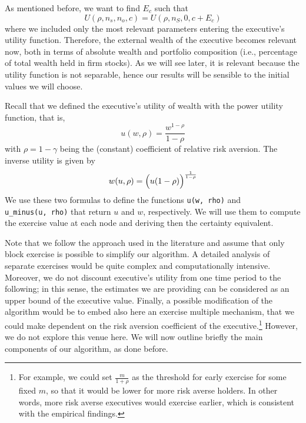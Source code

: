 As mentioned before, we want to find $E_c$ such that 
$$U(\rho, n_s, n_o, c) = U(\rho, n_S, 0, c + E_c) $$
where we included only the most relevant parameters entering the executive's utility function. Therefore, the external wealth of the executive becomes relevant now, both in terms of absolute wealth and portfolio composition (i.e., percentage of total wealth held in firm stocks). As we will see later, it is relevant because the utility function is not separable, hence our results will be sensible to the initial values we will choose.

Recall that we defined the executive's utility of wealth with the power utility function, that is, 
$$u(w, \rho) = \frac{w^{1-\rho}}{1-\rho}$$
with $\rho = 1 - \gamma $ being the (constant) coefficient of relative risk aversion. 
The inverse utility is given by 
$$w(u, \rho) = \Bigl(u(1-\rho)\Bigr)^{\frac{1}{1-\rho}}$$
We use these two formulas to define the functions \verb|u(w, rho)| and \\
\verb|u_minus(u, rho)| that return $u$ and $w$, respectively. We will use them to compute the exercise value at each node and deriving then the certainty equivalent.


Note that we follow the approach used in the literature and assume that only block exercise is possible  to simplify our algorithm. A detailed analysis of separate exercises would be quite complex and computationally intensive. Moreover, we do not discount executive's utility from one time period to the following; in this sense, the estimates we are providing can be considered as an upper bound of the executive value.
Finally, a possible modification of the algorithm would be to embed also here an exercise multiple mechanism, that we could make dependent on the risk aversion coefficient of the executive.\footnote{For example, we could set $\frac{m}{1+\rho}$ as the threshold for early exercise for some fixed $m$, so that it would be lower for more risk averse holders. In other words, more risk averse executives would exercise earlier, which is consistent with the empirical findings.} However, we do not explore this venue here.
We will now outline briefly the main components of our algorithm, as done before.

